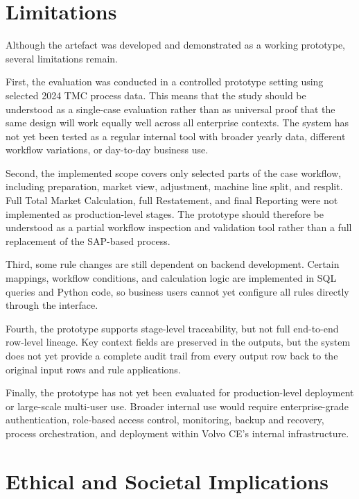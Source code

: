 \section{Limitations}

Although the artefact was developed and demonstrated as a working prototype, several limitations remain.

First, the evaluation was conducted in a controlled prototype setting using selected 2024 TMC process data. This means that the study should be understood as a single-case evaluation rather than as universal proof that the same design will work equally well across all enterprise contexts. The system has not yet been tested as a regular internal tool with broader yearly data, different workflow variations, or day-to-day business use.

Second, the implemented scope covers only selected parts of the case workflow, including preparation, market view, adjustment, machine line split, and resplit. Full Total Market Calculation, full Restatement, and final Reporting were not implemented as production-level stages. The prototype should therefore be understood as a partial workflow inspection and validation tool rather than a full replacement of the SAP-based process.

Third, some rule changes are still dependent on backend development. Certain mappings, workflow conditions, and calculation logic are implemented in SQL queries and Python code, so business users cannot yet configure all rules directly through the interface.

Fourth, the prototype supports stage-level traceability, but not full end-to-end row-level lineage. Key context fields are preserved in the outputs, but the system does not yet provide a complete audit trail from every output row back to the original input rows and rule applications.

Finally, the prototype has not yet been evaluated for production-level deployment or large-scale multi-user use. Broader internal use would require enterprise-grade authentication, role-based access control, monitoring, backup and recovery, process orchestration, and deployment within Volvo CE's internal infrastructure.


\section{Ethical and Societal Implications}

